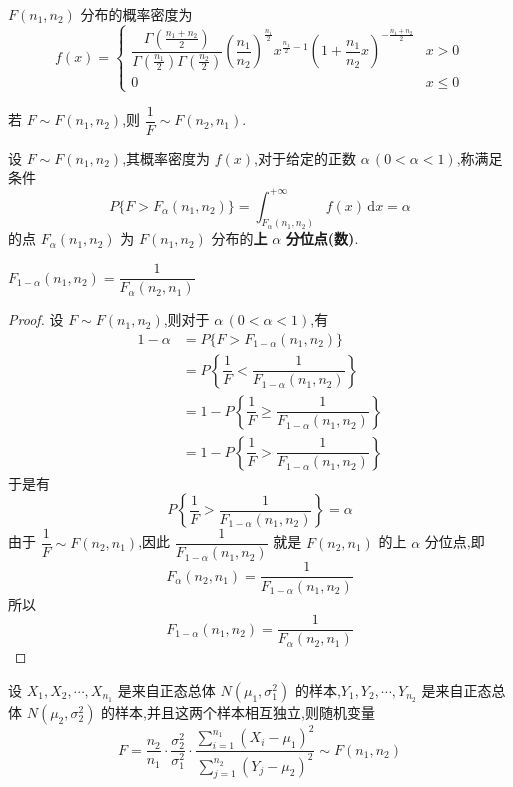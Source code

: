 $F(n_1, n_2)$ 分布的概率密度为
$$
f(x) = \begin{cases}
    \dfrac{\Gamma(\frac{n_1 + n_2}{2})}{\Gamma(\frac{n_1}{2}) \Gamma(\frac{n_2}{2})} \left( \dfrac{n_1}{n_2} \right)^{\frac{n_1}{2}} x^{\frac{n_1}{2} - 1} \left( 1 + \dfrac{n_1}{n_2} x \right)^{-\frac{n_1 + n_2}{2}} & x>0 \\[0.5em]
    0 & x \leqslant 0
\end{cases}
$$

若 $F \sim F(n_1, n_2)$,则 $\dfrac{1}{F} \sim F(n_2, n_1)$.

\begin{definition}
    设 $F \sim F(n_1, n_2)$,其概率密度为 $f(x)$,对于给定的正数 $\alpha \, (0 < \alpha < 1)$,称满足条件
    $$
    P \{ F > F_{\alpha}(n_1, n_2) \} = \int_{F_{\alpha}(n_1, n_2)}^{+\infty} f(x) \, \text{d}x = \alpha
    $$
    的点 $F_{\alpha}(n_1, n_2)$ 为 $F(n_1, n_2)$ 分布的\textbf{上} $\alpha$ \textbf{分位点(数)}.
\end{definition}

\begin{property}
    $F_{1 - \alpha}(n_1, n_2) = \dfrac{1}{F_{\alpha}(n_2, n_1)}$
\end{property}

\begin{proof}
    设 $F \sim F(n_1, n_2)$,则对于 $\alpha \, (0 < \alpha < 1)$,有
    $$
    \begin{aligned}
        1 - \alpha &= P \{ F > F_{1 - \alpha}(n_1, n_2) \} \\
        &= P \left\{ \dfrac{1}{F} < \dfrac{1}{F_{1 - \alpha}(n_1, n_2)} \right\} \\
        &= 1 - P \left\{ \dfrac{1}{F} \geqslant \dfrac{1}{F_{1 - \alpha}(n_1, n_2)} \right\} \\
        &= 1 - P \left\{ \dfrac{1}{F} > \dfrac{1}{F_{1 - \alpha}(n_1, n_2)} \right\}
    \end{aligned}
    $$
    于是有
    $$
    P \left\{ \dfrac{1}{F} > \dfrac{1}{F_{1 - \alpha}(n_1, n_2)} \right\} = \alpha
    $$
    由于 $\dfrac{1}{F} \sim F(n_2, n_1)$,因此 $\dfrac{1}{F_{1 - \alpha}(n_1, n_2)}$ 就是 $F(n_2, n_1)$ 的上 $\alpha$ 分位点,即
    $$
    F_{\alpha}(n_2, n_1) = \dfrac{1}{F_{1 - \alpha}(n_1, n_2)}
    $$
    所以
    $$
    F_{1 - \alpha}(n_1, n_2) = \dfrac{1}{F_{\alpha}(n_2, n_1)}
    $$
\end{proof}

\begin{theorem}
    设 $X_1, X_2, \cdots, X_{n_1}$ 是来自正态总体 $N(\mu_1, \sigma_1^2)$ 的样本,$Y_1, Y_2, \cdots, Y_{n_2}$ 是来自正态总体 $N(\mu_2, \sigma_2^2)$ 的样本,并且这两个样本相互独立,则随机变量
    $$
    F = \dfrac{n_2}{n_1} \cdot \dfrac{\sigma_2^2}{\sigma_1^2} \cdot \dfrac{\displaystyle\sum_{i=1}^{n_1} (X_i - \mu_1)^2}{\displaystyle\sum_{j=1}^{n_2} (Y_j - \mu_2)^2} \sim F(n_1, n_2)
    $$
\end{theorem}

